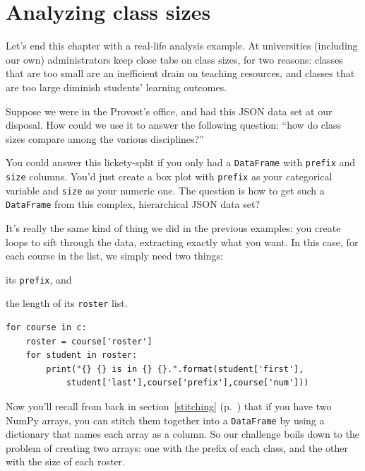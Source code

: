 \section{Analyzing class sizes}


Let's end this chapter with a real-life analysis example. At universities
(including our own) administrators keep close tabs on class sizes, for two
reasons: classes that are too small are an inefficient drain on teaching
resources, and classes that are too large diminish students' learning outcomes.


Suppose we were in the Provost's office, and had this JSON data set at our
disposal. How could we use it to answer the following question: ``how do class
sizes compare among the various disciplines?''

You could answer this lickety-split if you only had a \texttt{DataFrame} with
\texttt{prefix} and \texttt{size} columns. You'd just create a box plot with
\texttt{prefix} as your categorical variable and \texttt{size} as your numeric
one. The question is how to get such a \texttt{DataFrame} from this complex,
hierarchical JSON data set?

It's really the same kind of thing we did in the previous examples: you create
loops to sift through the data, extracting exactly what you want. In this case,
for each course in the list, we simply need two things:

\begin{compactenum}
\item its \texttt{prefix}, and
\item the length of its \texttt{roster} list.
\end{compactenum}

\begin{Verbatim}[fontsize=\footnotesize,samepage=true,frame=single,framesep=3mm]
for course in c:
    roster = course['roster']
    for student in roster:
        print("{} {} is in {} {}.".format(student['first'], 
            student['last'],course['prefix'],course['num'])) 
\end{Verbatim}

Now you'll recall from back in section~\ref{stitching} (p.~\pageref{stitching})
that if you have two NumPy arrays, you can stitch them together into a
\texttt{DataFrame} by using a dictionary that names each array as a column. So
our challenge boils down to the problem of creating two arrays: one with the
prefix of each class, and the other with the size of each roster.

